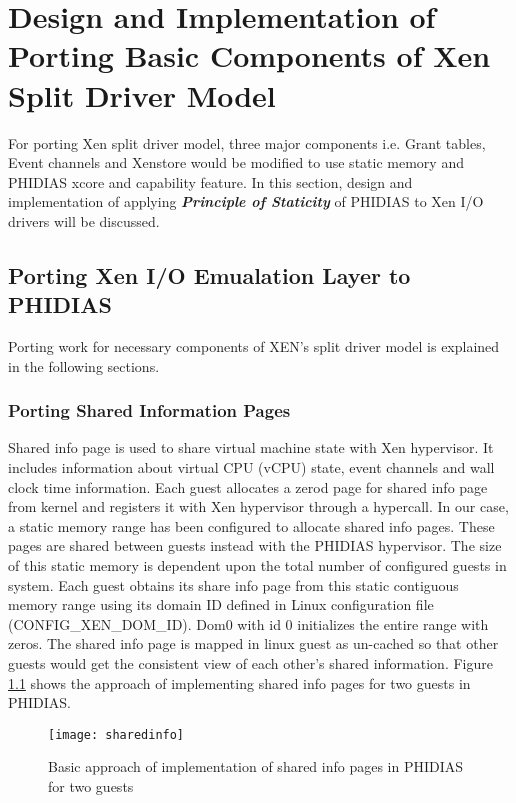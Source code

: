 \chapter{Design and Implementation of Porting Basic Components of Xen Split Driver Model\label{cha:chapter5}}
For porting Xen split driver model, three major components i.e. Grant tables, Event channels and Xenstore would be modified to use static memory and PHIDIAS xcore and capability feature. In this section, design and implementation of applying \textit{\textbf{Principle of Staticity}} of PHIDIAS to Xen I/O drivers will be discussed.

\section{Porting Xen I/O Emualation Layer to PHIDIAS\label{sec:memstatic}}
Porting work for necessary components of XEN's split driver model is explained in the following sections.

\subsection{Porting Shared Information Pages\label{sec:sharedinfo}}
Shared info page is used to share virtual machine state with Xen hypervisor. It includes information about virtual CPU (vCPU) state, event channels and wall clock time information. Each guest allocates a zerod page for shared info page from kernel and registers it with Xen hypervisor through a hypercall. In our case, a static memory range has been configured to allocate shared info pages. These pages are shared between guests instead with the PHIDIAS hypervisor. The size of this static memory is dependent upon the total number of configured guests in system. Each guest obtains its share info page from this static contiguous memory range using its domain ID defined in Linux configuration file (CONFIG\_XEN\_DOM\_ID). Dom0 with id 0 initializes the entire range with zeros. The shared info page is mapped in linux guest as un-cached so that other guests would get the consistent view of each other's shared information. Figure \ref{sharedinfo} shows the approach of implementing shared info pages for two guests in PHIDIAS.
\begin{figure}[!htbp]
	\centering
	\texttt{[image: sharedinfo]}
	\caption{Basic approach of implementation of shared info pages in PHIDIAS for two guests}
	\label{sharedinfo}
\end{figure}

